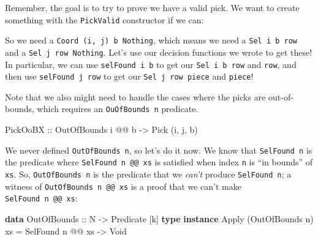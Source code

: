 \documentclass[]{article}
\newenvironment{Shaded}{}{}
\newcommand{\DataTypeTok}[1]{\textcolor[rgb]{0.56,0.13,0.00}{#1}}
\newcommand{\KeywordTok}[1]{\textcolor[rgb]{0.00,0.44,0.13}{\textbf{#1}}}
\newcommand{\NormalTok}[1]{#1}
\newcommand{\OperatorTok}[1]{\textcolor[rgb]{0.40,0.40,0.40}{#1}}
\newcommand{\OtherTok}[1]{\textcolor[rgb]{0.00,0.44,0.13}{#1}}
\begin{document}
Remember, the goal is to try to prove we have a valid pick. We want to create
something with the \texttt{PickValid} constructor if we can:

\begin{Shaded}
\end{Shaded}

So we need a
\texttt{Coord\ \textquotesingle{}(i,\ j)\ b\ \textquotesingle{}Nothing}, which
means we need a \texttt{Sel\ i\ b\ row} and a
\texttt{Sel\ j\ row\ \textquotesingle{}Nothing}. Let's use our decision
functions we wrote to get these! In particular, we can use
\texttt{selFound\ i\ b} to get our \texttt{Sel\ i\ b\ row} and \texttt{row}, and
then use \texttt{selFound\ j\ row} to get our \texttt{Sel\ j\ row\ piece} and
\texttt{piece}!

Note that we also might need to handle the cases where the picks are
out-of-bounds, which requires an \texttt{OuOfBounds\ n} predicate.

\begin{Shaded}
\begin{Highlighting}[]
\DataTypeTok{PickOoBX}\OtherTok{   ::} \DataTypeTok{OutOfBounds}\NormalTok{ i }\OperatorTok{@@}\NormalTok{ b }\OtherTok{{-}>} \DataTypeTok{Pick}\NormalTok{ \textquotesingle{}(i, j, b)}
\end{Highlighting}
\end{Shaded}

We never defined \texttt{OutOfBounds\ n}, so let's do it now. We know that
\texttt{SelFound\ n} is the predicate where \texttt{SelFound\ n\ @@\ xs} is
satisfied when index \texttt{n} is ``in bounds'' of \texttt{xs}. So,
\texttt{OutOfBounds\ n} is the predicate that we \emph{can't} produce
\texttt{SelFound\ n}; a witness of \texttt{OutOfBounds\ n\ @@\ xs} is a proof
that we can't make \texttt{SelFound\ n\ @@\ xs}:

\begin{Shaded}
\begin{Highlighting}[]
\KeywordTok{data} \DataTypeTok{OutOfBounds}\OtherTok{ ::} \DataTypeTok{N} \OtherTok{{-}>} \DataTypeTok{Predicate}\NormalTok{ [k]}
\KeywordTok{type} \KeywordTok{instance} \DataTypeTok{Apply}\NormalTok{ (}\DataTypeTok{OutOfBounds}\NormalTok{ n) xs }\OtherTok{=} \DataTypeTok{SelFound}\NormalTok{ n }\OperatorTok{@@}\NormalTok{ xs }\OtherTok{{-}>} \DataTypeTok{Void}
\end{Highlighting}
\end{Shaded}
\end{document}

